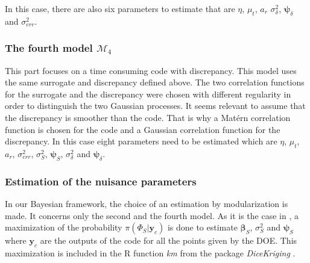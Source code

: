 \documentclass[soumission]{jsfds}
\begin{document}
In this case, there are also six parameters to estimate that are $\eta$, $\mu_t$, $a_r$ $\sigma_{\delta}^2$, $\boldsymbol{\psi}_{\delta}$ and $\sigma_{err}^2$.

\subsubsection{The fourth model $\mathcal{M}_4$}

This part focuses on a time consuming code with discrepancy. This model uses the same surrogate and discrepancy defined above. The two correlation functions for the surrogate and the discrepancy were chosen with different regularity in order to distinguish the two Gaussian processes. It seems relevant to assume that the discrepancy is smoother than the code. That is why a Matérn correlation function is chosen for the code and a Gaussian correlation function for the discrepancy. In this case eight parameters need to be estimated which are $\eta$, $\mu_t$, $a_r$, $\sigma_{err}^2$, $\sigma_S^2$, $\boldsymbol{\psi}_S$, $\sigma_{\delta}^2$ and $\boldsymbol{\psi}_{\delta}$.



\subsubsection{Estimation of the nuisance parameters}

In our Bayesian framework, the choice of an estimation by modularization is made. It concerns only the second and the fourth model. As it is the case in \citet{kennedy2001}, a maximization of the probability $\pi(\Phi_S|\boldsymbol{y}_c)$ is done to estimate $\boldsymbol{\beta}_S$, $\sigma_S^2$ and $\boldsymbol{\psi}_S$ where $\boldsymbol{y}_c$ are the outputs of the code for all the points given by the DOE. This maximization is included in the R function \textit{km} from the package \textit{DiceKriging} \citep{roustant2012}.
\end{document}
